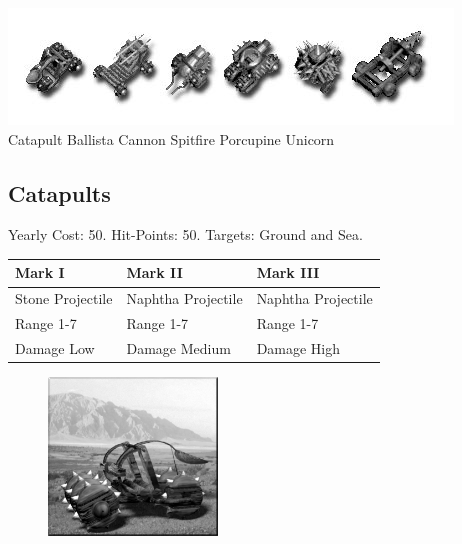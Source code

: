 
\begin{center}
	\includegraphics[width=0.7\linewidth]{Iweapons}
	\\ Catapult Ballista Cannon Spitfire Porcupine Unicorn
\end{center}

\clearpage

\subsection{Catapults}


\begin{center}
	Yearly Cost: 50. Hit-Points: 50. Targets: Ground and Sea.
\end{center}

\begin{tabular}{ | p{1.3in} | p{1.3in} | p{1.3in} |}
	\hline
	\textbf{Mark I}	& \textbf{Mark II} & \textbf{Mark III} \\ \hline
	Stone Projectile	& Naphtha Projectile & Naphtha Projectile \\ \hline
	Range 1-7	& Range 1-7& Range 1-7 \\ \hline
	Damage Low	& Damage Medium & Damage High \\ \hline
\end{tabular}

\begin{figure}
	\vspace{-20pt}
	\begin{center}
		\includegraphics[width=0.4\textwidth]{Acatapult}
	\end{center}
	\vspace{-50pt}
\end{figure}

